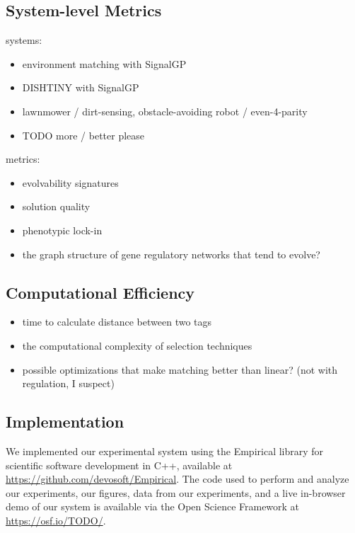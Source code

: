 \subsection{System-level Metrics}

systems:
\begin{itemize}
\item environment matching with SignalGP
\item DISHTINY with SignalGP
\item lawnmower \citep{spector2011tag} / dirt-sensing, obstacle-avoiding robot \citep{spector2011tag} / even-4-parity \citep{spector2012tag}
\item TODO more / better please
\end{itemize}

metrics:
\begin{itemize}
\item evolvability signatures \citep{tarapore2015evolvability}
\item solution quality
\item phenotypic lock-in
\item the graph structure of gene regulatory networks that tend to evolve?
\end{itemize}

\subsection{Computational Efficiency}

\begin{itemize}
\item time to calculate distance between two tags
\item the computational complexity of selection techniques
\item possible optimizations that make matching better than linear?
(not with regulation, I suspect)
\end{itemize}

\subsection{Implementation}

We implemented our experimental system using the Empirical library for scientific software development in C++, available at \url{https://github.com/devosoft/Empirical}.
The code used to perform and analyze our experiments, our figures, data from our experiments, and a live in-browser demo of our system is available via the Open Science Framework at \url{https://osf.io/TODO/}.
